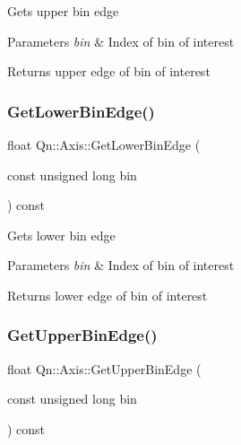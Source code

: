 Gets upper bin edge 
\begin{DoxyParams}{Parameters}
{\em bin} & Index of bin of interest \\
\hline
\end{DoxyParams}
\begin{DoxyReturn}{Returns}
upper edge of bin of interest 
\end{DoxyReturn}
\mbox{\label{classQn_1_1Axis_ac40575006fde015d3b25c7e838e21994}} 
\subsubsection{\texorpdfstring{Get\+Lower\+Bin\+Edge()}{GetLowerBinEdge()}}
{\footnotesize\ttfamily float Qn\+::\+Axis\+::\+Get\+Lower\+Bin\+Edge (\begin{DoxyParamCaption}\item[{const unsigned long}]{bin }\end{DoxyParamCaption}) const\hspace{0.3cm}{\ttfamily [inline]}}

Gets lower bin edge 
\begin{DoxyParams}{Parameters}
{\em bin} & Index of bin of interest \\
\hline
\end{DoxyParams}
\begin{DoxyReturn}{Returns}
lower edge of bin of interest 
\end{DoxyReturn}
\mbox{\label{classQn_1_1Axis_a8ac94e3567fb894439c0a4844c62e4a2}} 
\subsubsection{\texorpdfstring{Get\+Upper\+Bin\+Edge()}{GetUpperBinEdge()}}
{\footnotesize\ttfamily float Qn\+::\+Axis\+::\+Get\+Upper\+Bin\+Edge (\begin{DoxyParamCaption}\item[{const unsigned long}]{bin }\end{DoxyParamCaption}) const\hspace{0.3cm}{\ttfamily [inline]}}

